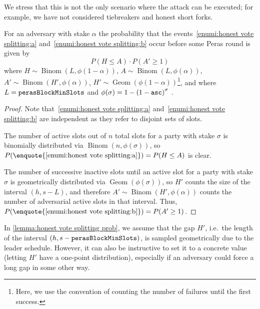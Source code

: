 We stress that this is not the only scenario where the attack can be executed; for example, we have not considered tiebreakers and honest short forks.

\begin{lemma}\label{lemma:honest vote splitting prob}
  For an adversary with stake $\alpha$ the probability that the events~\ref{enumi:honest vote splitting:a} and~\ref{enumi:honest vote splitting:b} occur before some Peras round is given by \[ P(H\le A) \cdot P(A' \ge 1) \]
  where $H\sim\operatorname{Binom}(L,\phi(1-\alpha))$, $A\sim\operatorname{Binom}(L,\phi(\alpha))$, $A' \sim \operatorname{Binom}(H',\phi(\alpha))$, $H' \sim \operatorname{Geom}(\phi(1-\alpha))$\footnote{Here, we use the convention of counting the number of failures until the first success.}, and where $L= \mathtt{perasBlockMinSlots}$ and $\phi(\sigma) = 1-{(1-\mathtt{asc})}^\sigma$ \parencite[(1)]{david2018ouroboros}.
\end{lemma}
\begin{proof}
  Note that~\ref{enumi:honest vote splitting:a} and~\ref{enumi:honest vote splitting:b} are independent as they refer to disjoint sets of slots.

  The number of active slots out of $n$ total slots for a party with stake $\sigma$ is binomially distributed via $\operatorname{Binom}(n,\phi(\sigma))$, so $P(\enquote{\ref{enumi:honest vote splitting:a}}) = P(H\le A)$ is clear.

  The number of successive inactive slots until an active slot for a party with stake $\sigma$ is geometrically distributed via $\operatorname{Geom}(\phi(\sigma))$, so $H'$ counts the size of the interval $(h,s-L)$, and therefore $A' \sim \operatorname{Binom}(H',\phi(\alpha))$ counts the number of adversarial active slots in that interval.
  Thus, $P(\enquote{\ref{enumi:honest vote splitting:b}}) = P(A'\ge 1)$.
\end{proof}

In \cref{lemma:honest vote splitting prob}, we assume that the gap $H'$, i.e.\ the length of the interval $(h,s-\mathtt{perasBlockMinSlots})$, is sampled geometrically due to the leader schedule.
However, it can also be instructive to set it to a concrete value (letting $H'$ have a one-point distribution), especially if an adversary could force a long gap in some other way.

